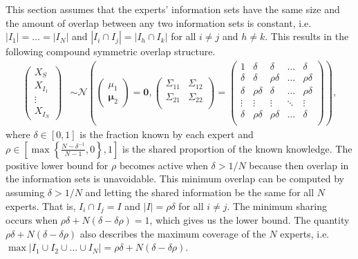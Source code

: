 \documentclass[11pt,twoside]{article}
\begin{document}
This section assumes that the experts' information sets have the same size and the amount of overlap between any two information sets is constant, i.e.  $|I_{1}| =  \dots = |I_{N}|$ and $|I_{i} \cap I_{j}| = |I_{h} \cap I_{k}|$ for all $i \neq j$ and $h \neq k$. This results in the following compound symmetric overlap structure. 
\begin{align*}
\left(\begin{matrix} X_{S} \\ X_{I_1}\\ \vdots \\ X_{I_N} \end{matrix}\right) &\sim \mathcal{N}\left( \left(\begin{matrix} 
\mu_1 \\ \boldsymbol{\mu}_2
 \end{matrix}\right) =
 \boldsymbol{0}, \left(\begin{matrix} 
\Sigma_{11} & \Sigma_{12}\\
\Sigma_{21} & \Sigma_{22}\\
 \end{matrix}\right) 
 =
 \left(\begin{array}{c|cccc}
1 & \delta & \delta & \dots & \delta  \\ \hline
\delta & \delta &\rho\delta & \dots & \rho\delta   \\ 
\delta & \rho\delta & \delta & \dots & \rho\delta  \\ 
\vdots & \vdots & \vdots & \ddots & \vdots  \\ 
\delta & \rho\delta & \rho\delta & \dots & \delta\\ 
 \end{array}\right)\right),
\end{align*}
where $\delta \in [0,1]$ is the fraction known by each expert and $\rho \in \left[  \max \left\{ \frac{N-\delta^{-1}}{N-1}, 0\right\}, 1 \right]$ is the shared proportion of the known knowledge. The positive lower bound for $\rho$ becomes active when $\delta > 1/N$ because then overlap in the information sets is unavoidable. This minimum overlap can be computed by assuming $\delta > 1/N$ and letting the shared information be the same for all $N$ experts. That is, $I_{i} \cap I_j = I$ and $|I| =  \rho \delta$ for all $i \neq j$. The minimum sharing occurs when $\rho\delta + N(\delta - \delta\rho) = 1$, which gives us the lower bound. The quantity  $\rho\delta + N(\delta - \delta\rho)$ also describes the maximum coverage of the $N$ experts, i.e. $\max | I_1 \cup I_2 \cup \dots \cup I_N| = \rho\delta + N(\delta - \delta\rho)$. 
\end{document}
